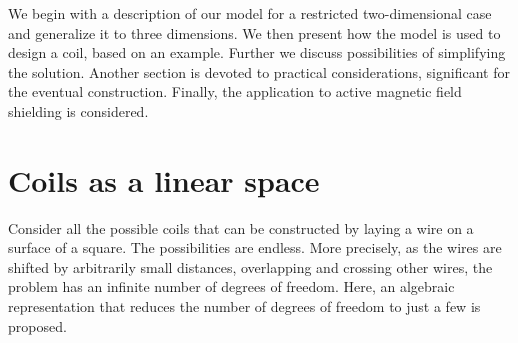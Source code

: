 We begin with a description of our model for a restricted two-dimensional case and generalize it to three dimensions. We then present how the model is used to design a coil, based on an example. Further we discuss possibilities of simplifying the solution. Another section is devoted to practical considerations, significant for the eventual construction. Finally, the application to active magnetic field shielding is considered.




\section{Coils as a linear space}
Consider all the possible coils that can be constructed by laying a wire on a surface of a square. The possibilities are endless.
More precisely, as the wires are shifted by arbitrarily small distances, overlapping and crossing other wires, the problem has an infinite number of degrees of freedom.
Here, an algebraic representation that reduces the number of degrees of freedom to just a few is proposed.

